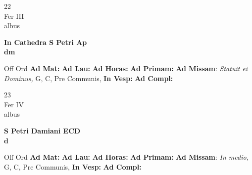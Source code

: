 \documentclass[10pt, openany]{book}
\begin{document}
        \begin{center}
            \begin{minipage}{3.5in}
                \vspace{2em}
                \begin{minipage}{0.5in}
                    {\Huge 22} \\
                    {\normalsize Fer III} \\
                    {\normalsize albus}
                \end{minipage}
                \begin{minipage}{3.0in}
                    \textbf{ \large In Cathedra S Petri Ap \\
                    \textnormal{\normalsize dm}} \\ 
                \end{minipage}
                \begin{justify}Off Ord
                    \textbf{Ad Mat: }
                    \textbf{Ad Lau: }
                    \textbf{Ad Horas: }
                    \textbf{Ad Primam: }\textbf{Ad Missam}: \textit{Statuit ei Dominus,} G, C, Pre Communis,  
                    \textbf{In Vesp: }
                    \textbf{Ad Compl: }
                \end{justify}
            \end{minipage}
        \end{center}
    
        \begin{center}
            \begin{minipage}{3.5in}
                \vspace{2em}
                \begin{minipage}{0.5in}
                    {\Huge 23} \\
                    {\normalsize Fer IV} \\
                    {\normalsize albus}
                \end{minipage}
                \begin{minipage}{3.0in}
                    \textbf{ \large S Petri Damiani ECD \\
                    \textnormal{\normalsize d}} \\ 
                \end{minipage}
                \begin{justify}Off Ord
                    \textbf{Ad Mat: }
                    \textbf{Ad Lau: }
                    \textbf{Ad Horas: }
                    \textbf{Ad Primam: }\textbf{Ad Missam}: \textit{In medio,} G, C, Pre Communis,  
                    \textbf{In Vesp: }
                    \textbf{Ad Compl: }
                \end{justify}
            \end{minipage}
        \end{center}
    
\end{document}
